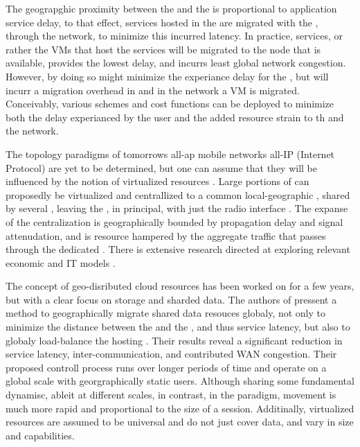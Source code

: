 The geograpghic proximity between the \ue and the \dc is proportional to application service delay, to that effect, services hosted in the \xcloud are migrated with the \ue, through the network, to minimize this incurred latency. In practice, services, or rather the VMs that host the services will be migrated to the node that is available, provides the lowest delay, and incurrs least global network congestion. However, by doing so might minimize the experiance delay for the \ue, but will incurr a migration overhead in \dc and in the network a VM is migrated. Conceivably, various schemes and cost functions can be deployed to minimize both the delay experianced by the user and the added resource strain to th \dc and the network.

The topology paradigms of tomorrows all-ap mobile networks all-IP (Internet Protocol) \cite{6144211,5357099} are yet to be determined, but one can assume that they will be influenced by the notion of virtualized resources \cite{baroncelli2010network, chowdhury2009network}. Large portions of \rbss can proposedly be virtualized and centrallized to a common local-geographic \dc, shared by several \rbss, leaving the \rbss, in principal, with just the radio interface \cite{melzercloud}. The expanse of the centralization is geographically bounded by propagation delay and signal attenudation, and is resource hampered by the aggregate traffic that passes through the dedicated \dc. There is extensive research directed at exploring relevant economic and IT models \cite{EricssonWhitePaper,6156350, 5357099}.

The concept of geo-disributed cloud resources has been worked on for a few years, but with a clear focus on storage and sharded data. The authors of \cite{agarwal2010volley} pressent a method to geographically migrate shared data resouces globaly, not only to minimize the distance between the \ue and the \dc, and thus service latency, but also to globaly load-balance the hosting \dcs. Their results reveal a significant reduction in service latency, inter-\dc communication, and contributed WAN congestion. Their proposed controll process runs over longer periods of time and operate on a global scale with georgraphically static users. Although sharing some fundamental dynamisc, ableit at different scales, in contrast, in the \xcloud paradigm, \ue movement is much more rapid and proportional to the size of a session. Additinally, \xcloud virtualized resources are assumed to be universal and do not just cover data, and vary in size and capabilities.

